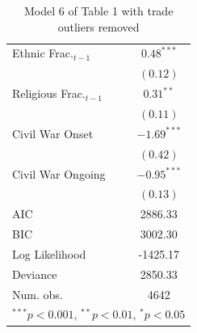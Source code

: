 \documentclass[12pt,a4paper]{article}\usepackage[]{graphicx}\usepackage[]{color}
\begin{document}
\begin{table}
\begin{center}
\begin{footnotesize}
\begin{tabular}{l c }
Ethnic Frac.$_{t-1}$    & $0.48^{***}$  \\
                        & $(0.12)$      \\
Religious Frac.$_{t-1}$ & $0.31^{**}$   \\
                        & $(0.11)$      \\
Civil War Onset         & $-1.69^{***}$ \\
                        & $(0.42)$      \\
Civil War Ongoing       & $-0.95^{***}$ \\
                        & $(0.13)$      \\
\hline
AIC                     & 2886.33       \\
BIC                     & 3002.30       \\
Log Likelihood          & -1425.17      \\
Deviance                & 2850.33       \\
Num. obs.               & 4642          \\
\hline
\multicolumn{2}{l}{\tiny{$^{***}p<0.001$, $^{**}p<0.01$, $^*p<0.05$}}
\end{tabular}
\end{footnotesize}
\caption{Model 6 of Table 1 with trade outliers removed}
\label{table:coefficients}
\end{center}
\end{table}
\end{document}
